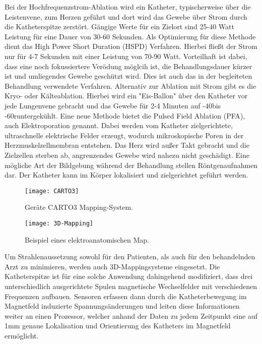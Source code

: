     Bei der Hochfrequenzstrom-Ablation wird ein Katheter, typischerweise über die Leistenvene, zum Herzen geführt und dort wird das Gewebe
    über Strom durch die Katheterspitze zerstört.
    Gängige Werte für ein Zielort sind 25-40 Watt Leistung für eine Dauer von 30-60 Sekunden.
    Als Optimierung für diese Methode dient das High Power Short Duration (HSPD) Verfahren.
    Hierbei fließt der Strom nur für 4-7 Sekunden mit einer Leistung von 70-90 Watt.
    Vorteilhaft ist dabei, dass eine noch fokussiertere Verödung möglcih ist, die Behandlungsdauer kürzer ist und umliegendes Gewebe geschützt wird.
    Dies ist auch das in der begleiteten Behandlung verwendete Verfahren.
    Alternativ zur Ablation mit Strom gibt es die Kryo- oder Kälteablation.
    Hierbei wird ein "Eis-Ballon" über den Katheter vor jede Lungenvene gebracht und das Gewebe für 2-4 Minuten auf -40\textcelsius bis -60\textcelsius runtergekühlt.
    Eine neue Methode bietet die Pulsed Field Ablation (PFA), auch Elektroporation genannt.
    Dabei werden vom Katheter zielgerichtete, ultraschnelle elektrische Felder erzeugt, wodurch mikroskopische Poren in der Herzmuskelzellmembran entstehen.
    Das Herz wird außer Takt gebracht und die Zielzellen sterben ab, angrenzendes Gewebe wird nahezu nicht geschädigt.
    Eine mögliche Art der Bildgebung während der Behandlung stellen Röntgenaufnahmen dar.
    Der Katheter kann im Körper lokalisiert und zielgerichtet geführt werden.
    \begin{figure}
        \centering
        \caption{Geräte CARTO3 Mapping-System.}
        \label{carto}
        \texttt{[image: CARTO3]}
        \centering
        \end{figure}
    \begin{figure}
        \centering
        \caption{Beispiel eines elektroanatomischen Map.}
        \label{map}
        \texttt{[image: 3D-Mapping]}
        \centering
        \end{figure}
    Um Strahlenaussetzung sowohl für den Patienten, als auch für den behandelnden Arzt zu minimieren, werden auch 3D-Mappingsysteme eingesetzt.
    Die Katheterspitze ist für eine solche Anwendung dahingehend modifiziert, dass drei unterschiedlich ausgerichtete Spulen magnetische Wechselfelder mit verschiedenen Frequenzen aufbauen.
    Sensoren erfassen dann durch die Katheterbewegung im Magnetfeld induzierte Spannungsänderungen und leiten diese Informationen weiter an einen Prozessor,
    welcher anhand der Daten zu jedem Zeitpunkt eine auf 1mm genaue Lokalisation und Orientierung des Katheters im Magnetfeld ermöglicht.
